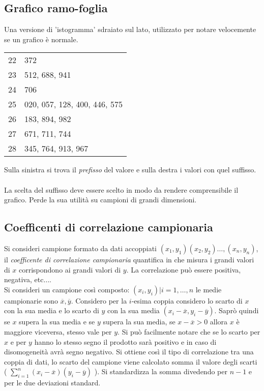 \documentclass{article}
\begin{document}
\subsection*{Grafico ramo-foglia}

Una versione di 'istogramma' sdraiato sul lato, utilizzato per notare velocemente se un grafico è normale.


\hfill

\begin{minipage}[c]{0.35\textwidth}
    \centering
    \begin{tabular}{r|l}
        22 & 372 \\
        23 & 512, 688, 941 \\
        24 & 706 \\
        25 & 020, 057, 128, 400, 446, 575 \\
        26 & 183, 894, 982 \\
        27 & 671, 711, 744 \\
        28 & 345, 764, 913, 967 \\
    \end{tabular}
\end{minipage}
\hspace{2mm}
\begin{minipage}[c]{0.6\textwidth}
    \vspace{-2mm}
    Sulla sinistra si trova il \textit{prefisso} del valore e sulla destra i valori con quel suffisso. \\ \\
    La scelta del suffisso deve essere scelto in modo da rendere comprensibile il grafico. Perde la sua utilità su campioni di grandi dimensioni.
\end{minipage}

\hfill

\subsection*{Coefficenti di correlazione campionaria}

Si consideri campione formato da dati accoppiati $(x_1,y_1)(x_2,y_2)\dots,(x_n,y_n)$, il \textit{coefficente di correlazione campionaria} quantifica in che misura i grandi valori di $x$ corrispondono ai grandi valori di $y$.  La correlazione può essere positiva, negativa, etc$\dots$. \\
Si consideri un campione così composto: $(x_i,y_i)| i=1,\dots,n$ le medie campionarie sono $\overline{x}, \overline{y}$. Considero per la $i$-esima coppia considero lo scarto di $x$ con la sua media e lo scarto di $y$ con la sua media $(x_i-\overline{x}, y_i-\overline{y})$. Saprò quindi se $x$ supera la sua media e se $y$ supera la sua media, se $x - \overline{x} > 0$ allora $x$ è maggiore viceversa, stesso vale per $y$. Si può facilmente notare che se lo scarto per $x$ e per $y$ hanno lo stesso segno il prodotto sarà positivo e in caso di disomogeneità avrà segno negativo. Si ottiene così il tipo di correlazione tra una coppia di dati, lo scarto del campione viene calcolato somma il valore degli scarti ( $\sum_{i=1}^n(x_i-\overline{x})(y_i-\overline{y})$ ). Si standardizza la somma divedendo per $n-1$ e per le due deviazioni standard. 
\end{document}
